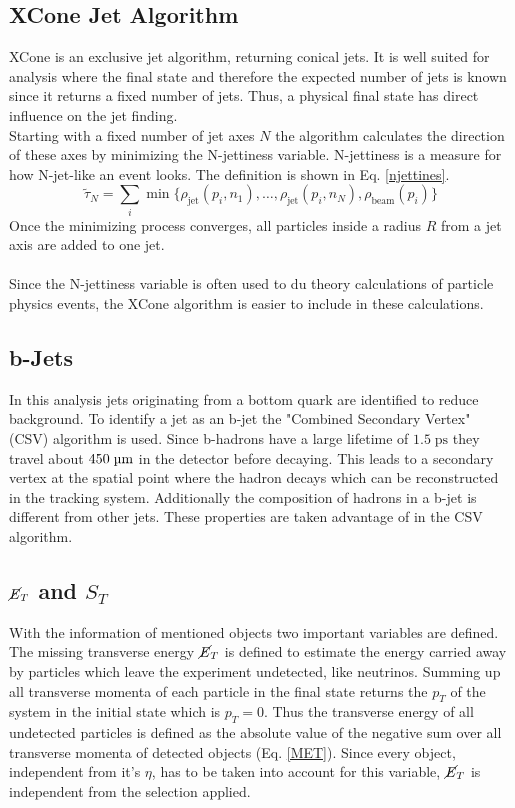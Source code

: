 \subsection{XCone Jet Algorithm}
\label{sec:xcone}
	XCone \cite{xcone} is an exclusive jet algorithm, returning conical jets. It is well suited for analysis where the final state and therefore the expected number of jets is known since it returns a fixed number of jets. Thus, a physical final state has direct influence on the jet finding. \\
	Starting with a fixed number of jet axes $N$ the algorithm calculates the direction of these axes by minimizing the N-jettiness variable. N-jettiness is a measure for how N-jet-like an event looks. The definition is shown in Eq. \ref{njettines}.
	\begin{equation}
	\tilde{\tau}_N = \sum_i \min\{\rho_\text{jet}(p_i, n_1), \dots, \rho_\text{jet}(p_i, n_N), \rho_\text{beam}(p_i)\}
	\label{njettines}
	\end{equation}
	Once the minimizing process converges, all particles inside a radius $R$ from a jet axis are added to one jet. \\	
	\\ Since the N-jettiness variable is often used to du theory calculations of particle physics events, the XCone algorithm is easier to include in these calculations.

\subsection{b-Jets}
	In this analysis jets originating from a bottom quark are identified to reduce background. To identify a jet as an b-jet the "Combined Secondary Vertex" (CSV) algorithm is used. Since b-hadrons have a large lifetime of $1.5\;\text{ps}$ they travel about $450\;\text{\textmu m}$ in the detector before decaying. This leads to a secondary vertex at the spatial point where the hadron decays which can be reconstructed in the tracking system. Additionally the composition of hadrons in a b-jet is different from other jets.
	These properties are taken advantage of in the CSV algorithm. 
	
\subsection{$\cancel{E}_T$ and $S_T$}
	With the information of mentioned objects two important variables are defined. The missing transverse energy $\cancel{E}_T$ is defined to estimate the energy carried away by particles which leave the experiment undetected, like neutrinos. Summing up all transverse momenta of each particle in the final state returns the $p_T$ of the system in the initial state which is $p_T = 0$. Thus the transverse energy of all undetected particles is defined as the absolute value of the negative sum over all transverse momenta of detected objects (Eq. \ref{MET}). Since every object, independent from it's $\eta$, has to be taken into account for this variable, $\cancel{E}_T$ is independent from the selection applied.
	
